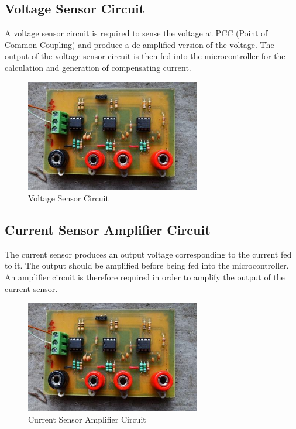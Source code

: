 \documentclass[journal,twoside]{IEEEtran}
\begin{document}
\subsection{Voltage Sensor Circuit}
A voltage sensor circuit is required to sense the voltage at
PCC (Point of Common Coupling) and produce a de-amplified
version of the voltage. The output of the voltage sensor circuit
is then fed into the microcontroller for the calculation and
generation of compensating current.
\begin{figure}[!ht]
\centering
\includegraphics[width=3in]{6}
\caption{Voltage Sensor Circuit}
\label{f6}
\end{figure}
\subsection{Current Sensor Amplifier Circuit}
The current sensor produces an output voltage
corresponding to the current fed to it. The output should be
amplified before being fed into the microcontroller. An
amplifier circuit is therefore required in order to amplify the
output of the current sensor.
\begin{figure}[!ht]
\centering
\includegraphics[width=3in]{6}
\caption{Current Sensor Amplifier Circuit}
\label{f6}
\end{figure}
\end{document}

